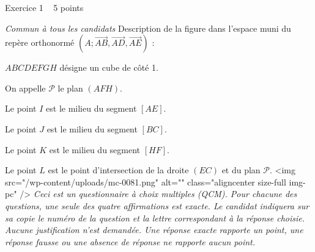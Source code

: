 
%
\begin{h2}Exercice 1   5 points\end{h2}
\textit{Commun à tous les candidats}
Description de la figure dans l'espace muni du repère orthonormé  $\left(A ;  \overrightarrow{AB}, \overrightarrow{AD}, \overrightarrow{AE}\right)$  :
\par
$ABCDEFGH$ désigne un cube de côté 1.
\par
On appelle $\mathscr P$ le plan $\left(AFH\right)$.
\par
Le point $I$ est le milieu du segment $\left[AE\right]$.
\par
Le point $J$ est le milieu du segment $\left[BC\right]$.
\par
Le point $K$ est le milieu du segment $\left[HF\right]$.
\par
Le point $L$ est le point d'intersection de la droite $\left(EC\right)$ et du plan $\mathscr P$.
<img src="/wp-content/uploads/mc-0081.png" alt="" class="aligncenter size-full  img-pc" />
\textit{Ceci est un questionnaire à choix multiples (QCM). Pour chacune des questions, une seule des quatre affirmations est exacte. Le candidat indiquera sur sa copie le numéro de la question et la lettre correspondant à la réponse choisie. Aucune justification n'est demandée. Une réponse exacte rapporte un point, une réponse fausse ou une absence de réponse ne rapporte aucun point.}
